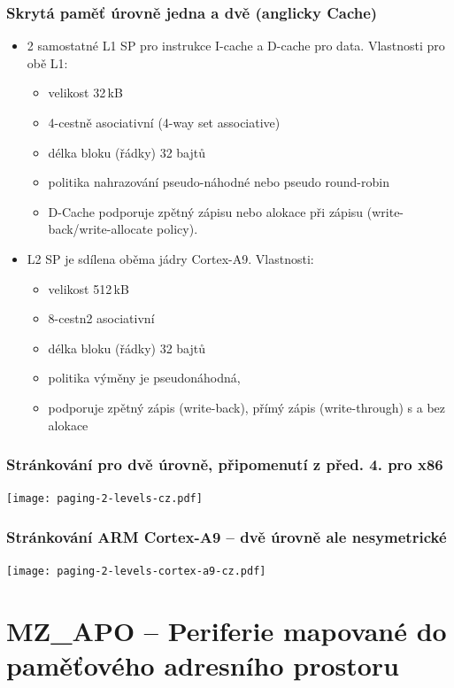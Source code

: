 \documentclass{beamer}
\begin{document}
\begin{frame}
\frametitle{Skrytá paměť úrovně jedna a dvě (anglicky Cache)}
\begin{itemize}
 \item 2 samostatné L1 SP pro instrukce I-cache a D-cache pro data. Vlastnosti pro obě L1:
 \begin{itemize}
  \item velikost 32\,kB
  \item 4-cestně asociativní (4-way set associative)
  \item délka bloku (řádky) 32 bajtů
  \item politika nahrazování pseudo-náhodné nebo pseudo round-robin
  \item D-Cache podporuje zpětný zápisu nebo alokace při zápisu (write-back/write-allocate policy).
 \end{itemize}
 \item L2 SP je sdílena oběma jádry Cortex-A9. Vlastnosti:
 \begin{itemize}
   \item velikost 512\,kB
   \item 8-cestn2 asociativní
   \item délka bloku (řádky) 32 bajtů
   \item politika výměny je pseudonáhodná,
   \item  podporuje zpětný zápis (write-back), přímý zápis (write-through) s a bez alokace
 \end{itemize}
\end{itemize}

\end{frame}

\begin{frame}
\frametitle{Stránkování pro dvě úrovně, připomenutí z před. 4. pro x86}

\texttt{[image: paging-2-levels-cz.pdf]}

\end{frame}

\begin{frame}
\frametitle{Stránkování ARM Cortex-A9 -- dvě úrovně ale nesymetrické}

\texttt{[image: paging-2-levels-cortex-a9-cz.pdf]}

\end{frame}

\section{MZ\_APO -- Periferie mapované do paměťového adresního prostoru}
\end{document}

